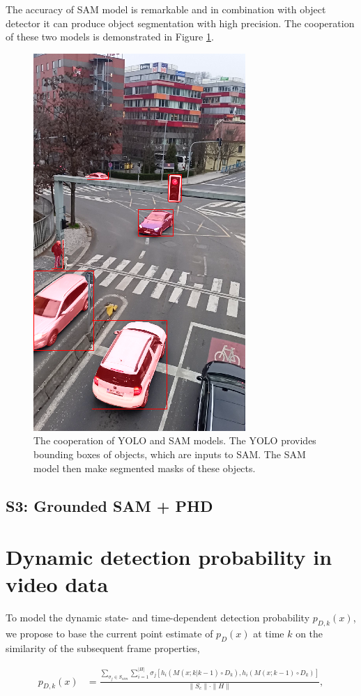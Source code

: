 The accuracy of SAM model is remarkable and in combination with object detector it can produce object segmentation
with high precision. The cooperation of these two models is demonstrated in Figure \ref{fig:yolo_sam_seg}.
\begin{figure}[h!t]
  \centering
  \includegraphics[width=0.35\linewidth]{text/chapter_04/imgs/YOLO_SAM_02}
  \caption{The cooperation of YOLO and SAM models. The YOLO provides bounding boxes of objects, which are inputs to
  SAM. The SAM model then make segmented masks of these objects.}
  \label{fig:yolo_sam_seg}
\end{figure}

\subsection{S3: Grounded SAM + PHD}




\section{Dynamic detection probability in video data}
\label{sec:dynamic_pd}
To model the dynamic state- and time-dependent detection probability $p_{D,k}(x)$, we propose to base the current
point estimate of $p_{D}(x)$ at time $k$ on the similarity of the subsequent frame properties,

  \begin{align}
    p_{D,k}(x) &= \frac{\sum_{\sigma_j \in S_{sim}} \sum_{i=1}^{|H|}
      \sigma_j\left[h_i\left(M(x; k|k-1) \!\circ\! D_k\right),
        h_i\left(M(x; k-1) \!\circ\! D_k\right)\right]}{\|S_c\| \cdot \|H\|}, \label{eq:similarity}
  \end{align}

